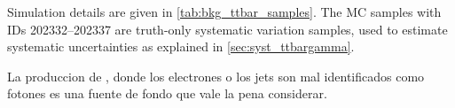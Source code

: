 Simulation details are given in {\tab} \ref{tab:bkg_ttbar_samples}. The MC samples with IDs 202332--202337 are truth-only systematic variation samples, used to estimate systematic
uncertainties as explained in {\Sec} \ref{sec:syst_ttbargamma}.




La produccion de {\ttbar}, donde los electrones o los jets
son mal identificados como fotones es una fuente de fondo que
vale la pena considerar.




%


